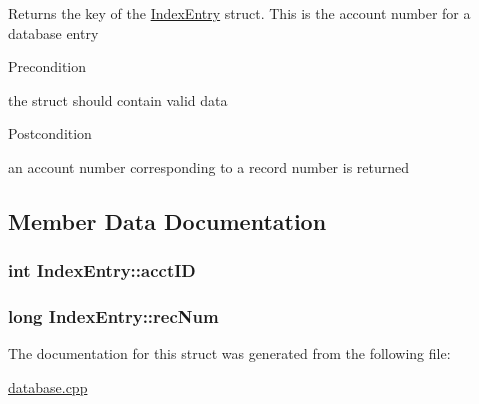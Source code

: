 \-Returns the key of the \hyperlink{struct_index_entry}{\-Index\-Entry} struct. \-This is the account number for a database entry

\begin{DoxyPrecond}{\-Precondition}

\begin{DoxyEnumerate}
\item the struct should contain valid data
\end{DoxyEnumerate}
\end{DoxyPrecond}
\begin{DoxyPostcond}{\-Postcondition}

\begin{DoxyEnumerate}
\item an account number corresponding to a record number is returned
\end{DoxyEnumerate}
\end{DoxyPostcond}

\begin{DoxyCode}
\end{DoxyCode}
 

\subsection{\-Member \-Data \-Documentation}
\hypertarget{struct_index_entry_aa5008695f70f365c7959d42ccca0fa13}{
\subsubsection[{acct\-I\-D}]{\setlength{\rightskip}{0pt plus 5cm}int {\bf \-Index\-Entry\-::acct\-I\-D}}}\label{struct_index_entry_aa5008695f70f365c7959d42ccca0fa13}
\hypertarget{struct_index_entry_a3f71077b699f2d718ca60df893c4c470}{
\subsubsection[{rec\-Num}]{\setlength{\rightskip}{0pt plus 5cm}long {\bf \-Index\-Entry\-::rec\-Num}}}\label{struct_index_entry_a3f71077b699f2d718ca60df893c4c470}


\-The documentation for this struct was generated from the following file\-:\begin{DoxyCompactItemize}
\item 
\hyperlink{database_8cpp}{database.\-cpp}\end{DoxyCompactItemize}
